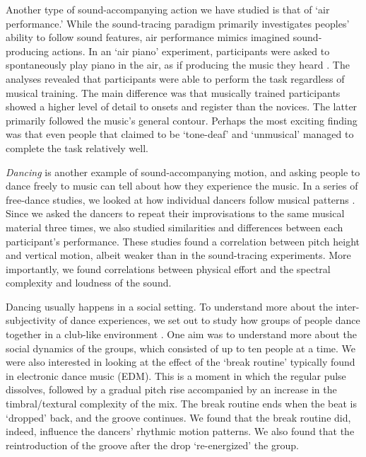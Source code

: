 Another type of sound-accompanying action we have studied is that of `air performance.' While the sound-tracing paradigm primarily investigates peoples' ability to follow sound features, air performance mimics imagined sound-producing actions. In an `air piano' experiment, participants were asked to spontaneously play piano in the air, as if producing the music they heard \citep{godoy_playing_2006}. The analyses revealed that participants were able to perform the task regardless of musical training. The main difference was that musically trained participants showed a higher level of detail to onsets and register than the novices. The latter primarily followed the music's general contour. Perhaps the most exciting finding was that even people that claimed to be `tone-deaf' and `unmusical' managed to complete the task relatively well.

\emph{Dancing} is another example of sound-accompanying motion, and asking people to dance freely to music can tell about how they experience the music.
In a series of free-dance studies, we looked at how individual dancers follow musical patterns \citep{jensenius_actionsound_2007,haga_correspondences_2008}. Since we asked the dancers to repeat their improvisations to the same musical material three times, we also studied similarities and differences between each participant's performance. These studies found a correlation between pitch height and vertical motion, albeit weaker than in the sound-tracing experiments. More importantly, we found correlations between physical effort and the spectral complexity and loudness of the sound.

Dancing usually happens in a social setting. To understand more about the inter-subjectivity of dance experiences, we set out to study how groups of people dance together in a club-like environment \citep{solberg_pleasurable_2017,solberg_group_2019}. One aim was to understand more about the social dynamics of the groups, which consisted of up to ten people at a time. We were also interested in looking at the effect of the `break routine' typically found in electronic dance music (EDM). This is a moment in which the regular pulse dissolves, followed by a gradual pitch rise accompanied by an increase in the timbral/textural complexity of the mix. The break routine ends when the beat is `dropped' back, and the groove continues. We found that the break routine did, indeed, influence the dancers' rhythmic motion patterns. We also found that the reintroduction of the groove after the drop `re-energized' the group.

